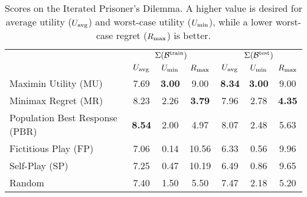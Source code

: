 \begin{table}[t]
    \small
    \setlength{\tabcolsep}{3pt}
    \centering
    \caption{
    Scores on the Iterated Prisoner's Dilemma. A higher value is desired for average utility ($U_\text{avg}$) and worst-case utility ($U_\text{min}$), while a lower worst-case regret ($R_\text{max}$) is better.}
    \label{tab:prisoner.train}
    \begin{tabular}{l||ccc||ccc||} %
    & \multicolumn{3}{c||}{$\Sigma(\mathcal{B}^\text{train})$} & \multicolumn{3}{c||}{$\Sigma(\mathcal{B}^\text{test})$}\\
    \cmidrule(lr){2-4}\cmidrule(lr){5-7}
               & $U_\text{avg}$ & $U_\text{min}$ & $R_\text{max}$ & $U_\text{avg}$ & $U_\text{min}$ & $R_\text{max}$ \\ \midrule
        Maximin Utility (MU) & 7.69 & \textbf{3.00} & 9.00 & \textbf{8.34} & \textbf{3.00} & 9.00\\
        Minimax Regret (MR)  & 8.23 & 2.26 & \textbf{3.79} & 7.96 & 2.78 & \textbf{4.35}\\ \hdashline
        Population Best Response (PBR) & \textbf{8.54} & 2.00 & 4.97 & 8.07 & 2.48 & 5.63\\
        Fictitious Play (FP)& 7.06 & 0.14 & 10.56 & 6.33 & 0.56 & 9.96\\
        Self-Play  (SP)& 7.25 & 0.47 & 10.19 & 6.49 & 0.86 & 9.65\\
        Random & 7.40 & 1.50 & 5.50 & 7.47 & 2.18 & 5.20\\
    \end{tabular}
\end{table}